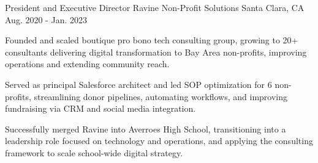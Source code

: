 \begin{cventries}
  \cventry
    {President and Executive Director} %
    {Ravine Non-Profit Solutions} %
    {Santa Clara, CA} %
    {Aug. 2020 - Jan. 2023} %
    {
      \begin{cvitems} %
        \item {Founded and scaled boutique pro bono tech consulting group, growing to 20+ consultants delivering digital transformation to Bay Area non-profits, improving operations and extending community reach.}
        \item {Served as principal Salesforce architect and led SOP optimization for 6 non-profits, streamlining donor pipelines, automating workflows, and improving fundraising via CRM and social media integration.}
        \item {Successfully merged Ravine into Averroes High School, transitioning into a leadership role focused on technology and operations, and applying the consulting framework to scale school-wide digital strategy.}
      \end{cvitems}
    }

\end{cventries}

